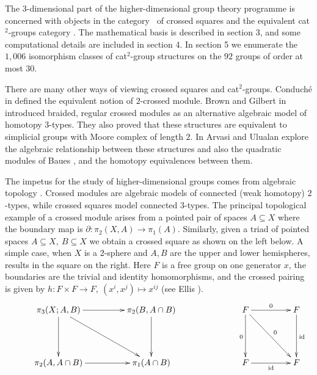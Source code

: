 \documentclass[a4paper,11pt]{article}
\theoremstyle{plain}
\theoremstyle{definition}
\begin{document}
The $3$-dimensional part of the higher-dimensional group theory programme 
is concerned with objects in the category \catXSq\ of crossed squares 
and the equivalent cat$^2$-groups category \catCatt. 
The mathematical basis is described in section 3, 
and some computational details are included in section 4. 
In section 5 we enumerate the $1,006$ isomorphism 
classes of cat$^2$-group structures on the $92$ groups of order at most $30$. 

There are many other ways of viewing crossed squares and cat$^2$-groups. 
Conduch\'{e} in \cite{conduche} defined the equivalent notion of 
$2$-crossed module.
Brown and Gilbert in \cite{brown-gilbert} introduced braided, 
regular crossed modules as an alternative algebraic model of homotopy $3$-types. 
They also proved that these structures are equivalent to simplicial groups 
with Moore complex of length $2$. 
In \cite{arvasi-ulualan} Arvasi and Ulualan explore the algebraic relationship 
between these structures and also the quadratic modules of Baues \cite{baues}, 
and the homotopy equivalences between them. 

The impetus for the study of higher-dimensional groups 
comes from algebraic topology \cite{brown-indag}. 
Crossed modules are algebraic models of connected (weak homotopy) $2$-types, 
while crossed squares model connected $3$-types. 
The principal topological example of a crossed module arises from 
a pointed pair of spaces $ A \subseteq X$ where the boundary map is 
$\partial : \pi_2(X,A) \to \pi_1(A)$. 
Similarly, given a triad of pointed spaces $A \subseteq X,\ B \subseteq X$ 
we obtain a crossed square as shown on the left below. 
A simple case, when $X$ is a $2$-sphere and $A,B$ are the 
upper and lower hemispheres, results in the square on the right. 
Here $F$ is a free group on one generator $x$, 
the boundaries are the trivial and identity homomorphisms, 
and the crossed pairing is given by 
$h : F \times F \to F,\ (x^i,x^j) \mapsto x^{ij}$  
(see Ellis \cite{ellis}). 
\begin{equation*} 
\xymatrix@R=20pt@C=20pt
{     &  \pi_3(X;A,B) \ar[dd] \ar[rr] \ar[ddrr] 
         &  & \pi_2(B, A \cap B) \ar[dd] 
               &  &  &  F \ar[dd]_{0} \ar[rr]^{0} \ar[ddrr]^{0} 
                        &  &  F \ar[dd]^{{\rm id}} \\
      &  &  &  &  &    \\  
      &  \pi_2(A,A \cap B) \ar[rr] 
         &  & \pi_1(A \cap B) & &  &  F \ar[rr]_{{\rm id}} 
                        &  &  F } 
\end{equation*}
\end{document}
